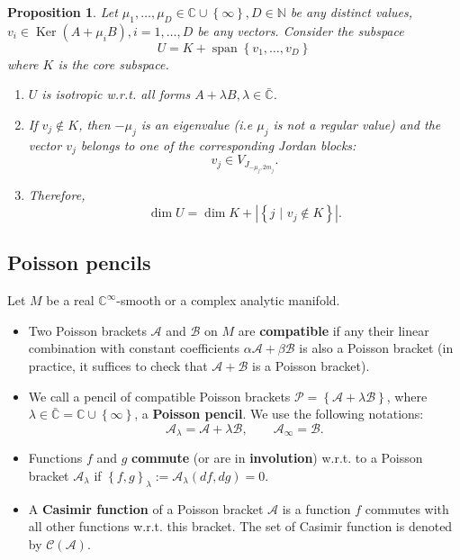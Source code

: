 \documentclass[12pt]{article}
\newtheorem{proposition}[lemma]{Proposition}
\theoremstyle{definition}
\begin{document}
\begin{proposition} \label{Prop:CommutLinear} Let $\mu_1, \dots, \mu_D \in \mathbb{C} \cup \left\{\infty\right\}, D \in \mathbb{N}$ be any distinct values,  $v_i \in \operatorname{Ker} (A + \mu_i B), i=1, \dots, D$ be any vectors. Consider the subspace \[ U = K + \operatorname{span}\left\{ v_1, \dots, v_D \right\}\] where $K$ is the core subspace.


\begin{enumerate}
    \item $U$ is isotropic w.r.t. all forms $A + \lambda B, \lambda \in \bar{\mathbb{C}}$.
    \item  If $v_j \not \in K$, then $-\mu_j$ is an eigenvalue (i.e $\mu_j$ is not a regular value) and the vector $v_j$ belongs to one of the corresponding Jordan blocks:  \[ v_j \in V_{J_{-\mu_j, 2m_j}}. \] 
    \item Therefore, \[ \dim U = \dim K + \left| \left\{j \,\, \bigr| \,\, v_j \not \in K \right\} \right|. \] 
\end{enumerate} 
\end{proposition}


\subsection{Poisson pencils}

Let $M$ be a real $\mathbb{C}^{\infty}$-smooth or a complex analytic manifold. 

\begin{itemize}

\item Two Poisson brackets  $\mathcal{A}$ and $\mathcal{B}$ on $M$ are  \textbf{compatible} if any their linear combination with constant coefficients $\alpha \mathcal{A} + \beta \mathcal{B}$ is also a Poisson bracket (in practice, it suffices to check that $\mathcal{A} + \mathcal{B}$ is a Poisson bracket). 

\item We call a pencil of compatible Poisson brackets $\mathcal{P} = \left\{ \mathcal{A} + \lambda \mathcal{B} \right\} $, where $\lambda \in \bar{\mathbb{C}} = \mathbb{C} \cup \left\{ \infty \right\}$, a \textbf{Poisson pencil}. We use the following notations:  \[\mathcal{A}_{\lambda} = \mathcal{A} + \lambda \mathcal{B}, \qquad \mathcal{A}_{\infty} = \mathcal{B}.\] 

\item Functions $f$ and $g$ \textbf{commute} (or are in \textbf{involution}) w.r.t. to a Poisson bracket $\mathcal{A}_{\lambda}$ if $\left\{ f, g\right\}_{\lambda} := \mathcal{A}_{\lambda}(df, dg) = 0$.

\item A \textbf{Casimir function} of a Poisson bracket $\mathcal{A}$ is a function $f$ commutes with all other functions w.r.t. this bracket. The set of Casimir function is denoted by $\mathcal{C} \left( \mathcal{A}\right)$.


\end{itemize}
\end{document}

